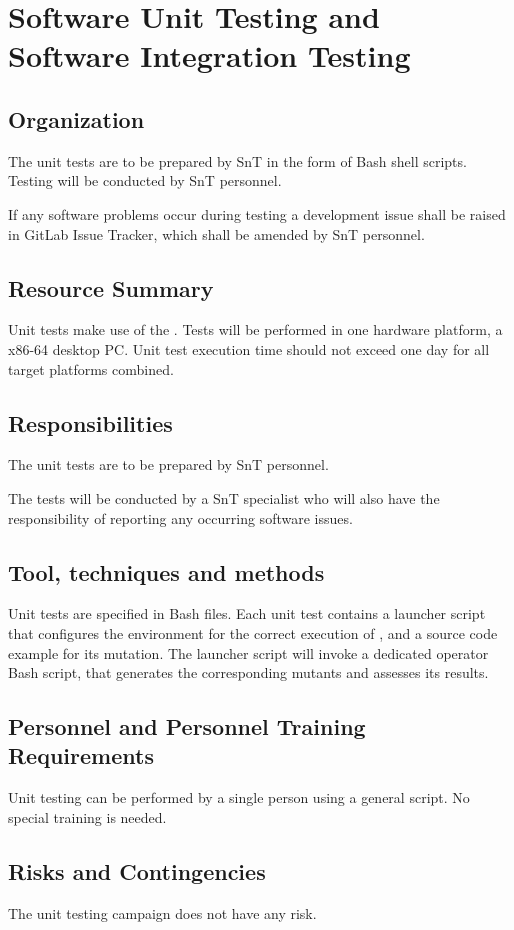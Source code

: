 
\chapter{Software Unit Testing and Software Integration Testing}

\section{Organization}

The unit tests are to be prepared by SnT in the form of Bash shell scripts. Testing will be conducted by SnT personnel.

If any software problems occur during testing a development issue shall be raised in GitLab Issue Tracker, which shall be amended by SnT personnel.



\section{Resource Summary}

Unit tests make use of the \FAQAS. Tests will be performed in one hardware platform, a x86-64 desktop PC. Unit test execution time should not exceed one day for all target platforms combined.

\section{Responsibilities}

The unit tests are to be prepared by SnT personnel.

The tests will be conducted by a SnT specialist who will also have the responsibility of reporting any occurring software issues.

\section{Tool, techniques and methods}

Unit tests are specified in Bash files. Each unit test contains a launcher script that configures the environment for the correct execution of \FAQAS, and a source code example for its mutation. The launcher script will invoke a dedicated operator Bash script, that generates the corresponding mutants and assesses its results.

\section{Personnel and Personnel Training Requirements}

Unit testing can be performed by a single person using a general script. No special training is needed.

\section{Risks and Contingencies}

The unit testing campaign does not have any risk.